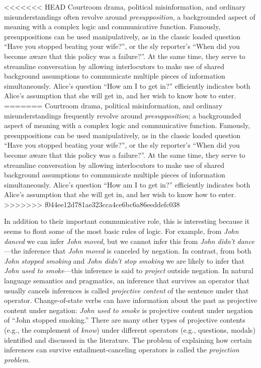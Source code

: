 \documentclass[10pt,letterpaper]{article}
\begin{document}
<<<<<<< HEAD
Courtroom drama, political misinformation, and ordinary misunderstandings often revolve around \emph{presupposition}, a backgrounded aspect of meaning with a complex logic and communicative function. Famously, presuppositions can be used manipulatively, as in the classic loaded question ``Have you stopped beating your wife?'', or the sly reporter's ``When did you become aware that this policy was a failure?''. At the same time, they serve to streamline conversation by allowing interlocutors to make use of shared background assumptions to communicate multiple pieces of information simultaneously. Alice's question ``How am I to get in?'' efficiently indicates both Alice's assumption that she will get in, and her wish to know how to enter.
=======
Courtroom drama, political misinformation, and ordinary misunderstandings frequently revolve around \emph{presupposition}; a backgrounded aspect of meaning with a complex logic and communicative function. Famously, presuppositions can be used manipulatively, as in the classic loaded question ``Have you stopped beating your wife?'', or the sly reporter's ``When did you become aware that this policy was a failure?''. At the same time, they serve to streamline conversation by allowing interlocutors to make use of shared background assumptions to communicate multiple pieces of information simultaneously. Alice's question ``How am I to get in?'' efficiently indicates both Alice's assumption that she will get in, and her wish to know how to enter.
>>>>>>> f044ee12d781ae323cca4ce6bc6a86eeddefc038

In addition to their important communicative role, this  is interesting because it seems to flout some of the most basic rules of logic. For example, from \emph{John danced} we can infer \emph{John moved}, but we cannot infer this from \emph{John didn't dance}---the inference that \emph{John moved} is canceled by negation.
In contrast, from both \emph{John stopped smoking} and \emph{John didn't stop smoking} we are likely to infer that \emph{John used to smoke}---this inference is said to \emph{project} outside negation.
In natural language semantics and pragmatics, an inference that survives an operator that usually cancels inferences is called
 \emph{projective content} of the sentence under that operator. 
Change-of-state verbs can have information about the past as projective content under negation: \emph{John used to smoke} is projective content under negation of ``John stopped smoking.'' 
There are many other types of projective contents 
 (e.g., the complement of \emph{know}) under different operators 
 (e.g., questions, modals) identified and discussed in the literature. 
The problem of explaining how certain inferences can
 survive entailment-canceling operators is called the \emph{projection problem}.
\end{document}
